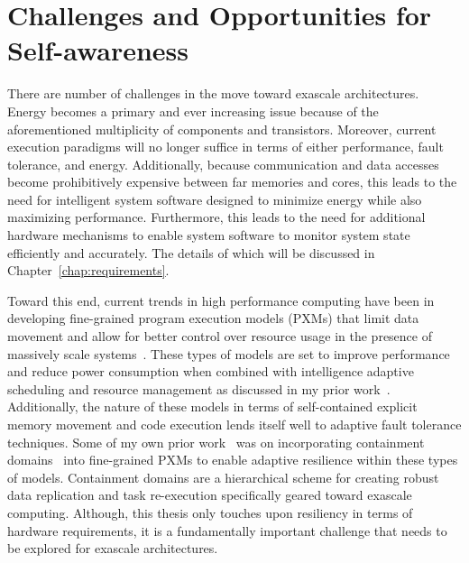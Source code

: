 \section{Challenges and Opportunities for Self-awareness}
    There are number of challenges in the move toward exascale architectures. Energy becomes a primary and ever increasing issue because of the aforementioned multiplicity of components and transistors. Moreover, current execution paradigms will no longer suffice in terms of either performance, fault tolerance, and energy. Additionally, because communication and data accesses become prohibitively expensive between far memories and cores, this leads to the need for intelligent system software designed to minimize energy while also maximizing performance. Furthermore, this leads to the need for additional hardware mechanisms to enable system software to monitor system state efficiently and accurately. The details of which will be discussed in Chapter~\ref{chap:requirements}.

    Toward this end, current trends in high performance computing have been in developing fine-grained program execution models (PXMs) that limit data movement and allow for better control over resource usage in the presence of massively scale systems~\cite{KnauerhaseEtAl2012, OCR_SC12, TM104, ZuckermanEtAl2011, LauderdaleEtAl2012, SuetterleinZucGao2013}. These types of models are set to improve performance and reduce power consumption when combined with intelligence adaptive scheduling and resource management as discussed in my prior work~\cite{ZuckermanEtAl2014}. Additionally, the nature of these models in terms of self-contained explicit memory movement and code execution lends itself well to adaptive fault tolerance techniques. Some of my own prior work~\cite{KaplanEtAl2015} was on incorporating containment domains~\cite{Containment2012} into fine-grained PXMs to enable adaptive resilience within these types of models. Containment domains are a hierarchical scheme for creating robust data replication and task re-execution specifically geared toward exascale computing. Although, this thesis only touches upon resiliency in terms of hardware requirements, it is a fundamentally important challenge that needs to be explored for exascale architectures.
